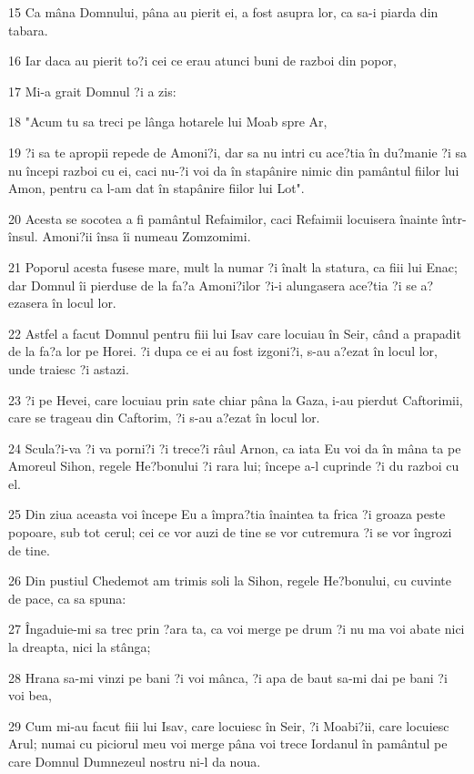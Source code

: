 \par 15 Ca mâna Domnului, pâna au pierit ei, a fost asupra lor, ca sa-i piarda din tabara.
\par 16 Iar daca au pierit to?i cei ce erau atunci buni de razboi din popor,
\par 17 Mi-a grait Domnul ?i a zis:
\par 18 "Acum tu sa treci pe lânga hotarele lui Moab spre Ar,
\par 19 ?i sa te apropii repede de Amoni?i, dar sa nu intri cu ace?tia în du?manie ?i sa nu începi razboi cu ei, caci nu-?i voi da în stapânire nimic din pamântul fiilor lui Amon, pentru ca l-am dat în stapânire fiilor lui Lot".
\par 20 Acesta se socotea a fi pamântul Refaimilor, caci Refaimii locuisera înainte într-însul. Amoni?ii însa îi numeau Zomzomimi.
\par 21 Poporul acesta fusese mare, mult la numar ?i înalt la statura, ca fiii lui Enac; dar Domnul îi pierduse de la fa?a Amoni?ilor ?i-i alungasera ace?tia ?i se a?ezasera în locul lor.
\par 22 Astfel a facut Domnul pentru fiii lui Isav care locuiau în Seir, când a prapadit de la fa?a lor pe Horei. ?i dupa ce ei au fost izgoni?i, s-au a?ezat în locul lor, unde traiesc ?i astazi.
\par 23 ?i pe Hevei, care locuiau prin sate chiar pâna la Gaza, i-au pierdut Caftorimii, care se trageau din Caftorim, ?i s-au a?ezat în locul lor.
\par 24 Scula?i-va ?i va porni?i ?i trece?i râul Arnon, ca iata Eu voi da în mâna ta pe Amoreul Sihon, regele He?bonului ?i rara lui; începe a-l cuprinde ?i du razboi cu el.
\par 25 Din ziua aceasta voi începe Eu a împra?tia înaintea ta frica ?i groaza peste popoare, sub tot cerul; cei ce vor auzi de tine se vor cutremura ?i se vor îngrozi de tine.
\par 26 Din pustiul Chedemot am trimis soli la Sihon, regele He?bonului, cu cuvinte de pace, ca sa spuna:
\par 27 Îngaduie-mi sa trec prin ?ara ta, ca voi merge pe drum ?i nu ma voi abate nici la dreapta, nici la stânga;
\par 28 Hrana sa-mi vinzi pe bani ?i voi mânca, ?i apa de baut sa-mi dai pe bani ?i voi bea,
\par 29 Cum mi-au facut fiii lui Isav, care locuiesc în Seir, ?i Moabi?ii, care locuiesc Arul; numai cu piciorul meu voi merge pâna voi trece Iordanul în pamântul pe care Domnul Dumnezeul nostru ni-l da noua.
